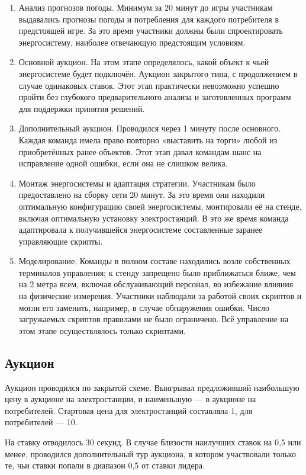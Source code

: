 \begin{enumerate}
    \item Анализ прогнозов погоды. Минимум за 20 минут до игры участникам выдавались прогнозы погоды и потребления для каждого потребителя в предстоящей игре. За это время участники должны были спроектировать энергосистему, наиболее отвечающую предстоящим условиям.
    \item Основной аукцион. На этом этапе определялось, какой объект к чьей энергосистеме будет подключён. Аукцион закрытого типа, с продолжением в случае одинаковых ставок. Этот этап практически невозможно успешно пройти без глубокого предварительного анализа и заготовленных программ для поддержки принятия решений.
    \item Дополнительный аукцион. Проводился через 1 минуту после основного. Каждая команда имела право повторно «выставить на торги» любой из приобретённых ранее объектов. Этот этап давал командам шанс на исправление одной ошибки, если она не слишком велика.
    \item Монтаж энергосистемы и адаптация стратегии. Участникам было предоставлено на сборку сети 20 минут. За это время они находили оптимальную конфигурацию своей энергосистемы, монтировали её на стенде, включая оптимальную установку электростанций. В это же время команда адаптировала к получившейся энергосистеме составленные заранее управляющие скрипты.
    \item Моделирование. Команды в полном составе находились возле собственных терминалов управления; к стенду запрещено было приближаться ближе, чем на 2 метра всем, включая обслуживающий персонал, во избежание влияния на физические измерения. Участники наблюдали за работой своих скриптов и могли его заменить, например, в случае обнаружения ошибки. Число загружаемых скриптов правилами не было ограничено. Всё управление на этом этапе осуществлялось только скриптами.
\end{enumerate}

\subsection*{Аукцион}

Аукцион проводился по закрытой схеме. Выигрывал предложивший наибольшую цену в аукционе на электростанции, и наименьшую — в аукционе на потребителей. Стартовая цена для электростанций составляла 1, для потребителей — 10.

На ставку отводилось 30 секунд. В случае близости наилучших ставок на 0,5 или менее, проводился дополнительный тур аукциона, в котором участвовали только те, чьи ставки попали в диапазон 0,5 от ставки лидера.

